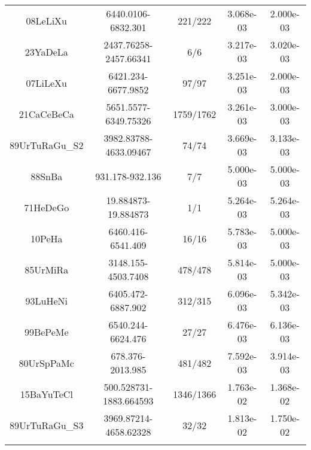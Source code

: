 \begin{longtable}{c c c c c}
08LeLiXu \cite{08LeLiXu} & 6440.0106-6832.301 & 221/222 & 3.068e-03 & 2.000e-03 \\
23YaDeLa \cite{23YaDeLa} & 2437.76258-2457.66341 & 6/6 & 3.217e-03 & 3.020e-03 \\
07LiLeXu \cite{07LiLeXu} & 6421.234-6677.9852 & 97/97 & 3.251e-03 & 2.000e-03 \\
21CaCeBeCa \cite{21CaCeBeCa} & 5651.5577-6349.75326 & 1759/1762 & 3.261e-03 & 3.000e-03 \\
89UrTuRaGu_S2 \cite{89UrTuRaGu_S2} & 3982.83788-4633.09467 & 74/74 & 3.669e-03 & 3.133e-03 \\
88SnBa \cite{88SnBa} & 931.178-932.136 & 7/7 & 5.000e-03 & 5.000e-03 \\
71HeDeGo \cite{71HeDeGo} & 19.884873-19.884873 & 1/1 & 5.264e-03 & 5.264e-03 \\
10PeHa \cite{10PeHa} & 6460.416-6541.409 & 16/16 & 5.783e-03 & 5.000e-03 \\
85UrMiRa \cite{85UrMiRa} & 3148.155-4503.7408 & 478/478 & 5.814e-03 & 5.000e-03 \\
93LuHeNi \cite{93LuHeNi} & 6405.472-6887.902 & 312/315 & 6.096e-03 & 5.342e-03 \\
99BePeMe \cite{99BePeMe} & 6540.244-6624.476 & 27/27 & 6.476e-03 & 6.136e-03 \\
80UrSpPaMc \cite{80UrSpPaMc} & 678.376-2013.985 & 481/482 & 7.592e-03 & 3.914e-03 \\
15BaYuTeCl \cite{15BaYuTeCl} & 500.528731-1883.664593 & 1346/1366 & 1.763e-02 & 1.368e-02 \\
89UrTuRaGu_S3 \cite{89UrTuRaGu_S3} & 3969.87214-4658.62328 & 32/32 & 1.813e-02 & 1.750e-02 \\
\hline
\caption{}
\end{longtable}
